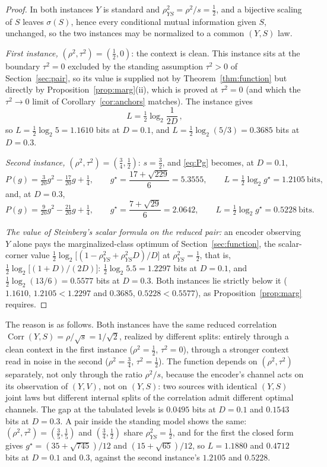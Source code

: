 \documentclass[11pt,onecolumn]{IEEEtran}
\begin{document}
\begin{proof}
In both instances $Y$ is standard and
$\rho_{YS}^2=\rho^2/s=\tfrac12$, and a bijective scaling of $S$ leaves
$\sigma(S)$, hence every conditional mutual information given $S$,
unchanged, so the two instances may be normalized to a common $(Y,S)$
law.

\emph{First instance,} $(\rho^2,\tau^2)=(\tfrac12,0)$: the context is
clean. This instance sits at the boundary $\tau^2=0$ excluded by the
standing assumption $\tau^2>0$ of Section~\ref{sec:pair}, so its value
is supplied not by Theorem~\ref{thm:function} but directly by
Proposition~\ref{prop:marg}(ii), which is proved at $\tau^2=0$ (and
which the $\tau^2\to0$ limit of Corollary~\ref{cor:anchors} matches). The instance gives
\[
L=\tfrac12\log_2\frac{1}{2D}\,,
\]
so $L=\tfrac12\log_2 5=1.1610$ bits
at $D=0.1$, and $L=\tfrac12\log_2(5/3)=0.3685$ bits at $D=0.3$.

\emph{Second instance,} $(\rho^2,\tau^2)=(\tfrac34,\tfrac12)$:
$s=\tfrac32$, and \eqref{eq:Pg} becomes, at $D=0.1$,
\[
P(g)=\tfrac{3}{20}g^2-\tfrac{17}{20}g+\tfrac14,
\qquad
g^\star=\frac{17+\sqrt{229}}{6}=5.3555,
\qquad
L=\tfrac12\log_2 g^\star=1.2105\ \text{bits},
\]
and, at $D=0.3$,
\[
P(g)=\tfrac{9}{20}g^2-\tfrac{21}{20}g+\tfrac14,
\qquad
g^\star=\frac{7+\sqrt{29}}{6}=2.0642,
\qquad
L=\tfrac12\log_2 g^\star=0.5228\ \text{bits}.
\]

\emph{The value of Steinberg's scalar formula on the reduced pair:} an
encoder observing $Y$
alone pays the marginalized-class optimum of
Section~\ref{sec:function}, the scalar-corner value
$\tfrac12\log_2\bigl[(1-\rho_{YS}^2+\rho_{YS}^2D)/D\bigr]$ at
$\rho_{YS}^2=\tfrac12$, that is,
$\tfrac12\log_2\bigl[(1+D)/(2D)\bigr]$: $\tfrac12\log_2 5.5=1.2297$
bits at $D=0.1$, and $\tfrac12\log_2(13/6)=0.5577$ bits at $D=0.3$.
Both instances lie strictly below it ($1.1610,\,1.2105<1.2297$ and
$0.3685,\,0.5228<0.5577$), as Proposition~\ref{prop:marg} requires.
\end{proof}

The reason is as follows. Both instances have the same
reduced correlation $\operatorname{Corr}(Y,S)=\rho/\sqrt{s}=1/\sqrt2$,
realized by different splits: entirely through a clean context in the
first instance ($\rho^2=\tfrac12$, $\tau^2=0$), through a stronger
context read in noise in the second ($\rho^2=\tfrac34$,
$\tau^2=\tfrac12$). The function depends on $(\rho^2,\tau^2)$
separately, not only through the ratio $\rho^2/s$, because the
encoder's channel acts on its observation of $(Y,V)$, not on $(Y,S)$:
two sources with identical $(Y,S)$ joint laws but different internal
splits of the correlation admit different optimal channels.
The gap at the tabulated levels is $0.0495$ bits at $D=0.1$ and
$0.1543$ bits at $D=0.3$. A pair inside the standing model shows the
same: $(\rho^2,\tau^2)=(\tfrac35,\tfrac15)$ and $(\tfrac34,\tfrac12)$
share $\rho_{YS}^2=\tfrac12$, and for the first the closed form gives
$g^\star=(35+\sqrt{745})/12$ and $(15+\sqrt{65})/12$, so $L=1.1880$ and
$0.4712$ bits at $D=0.1$ and $0.3$, against the second instance's
$1.2105$ and $0.5228$.
\end{document}
